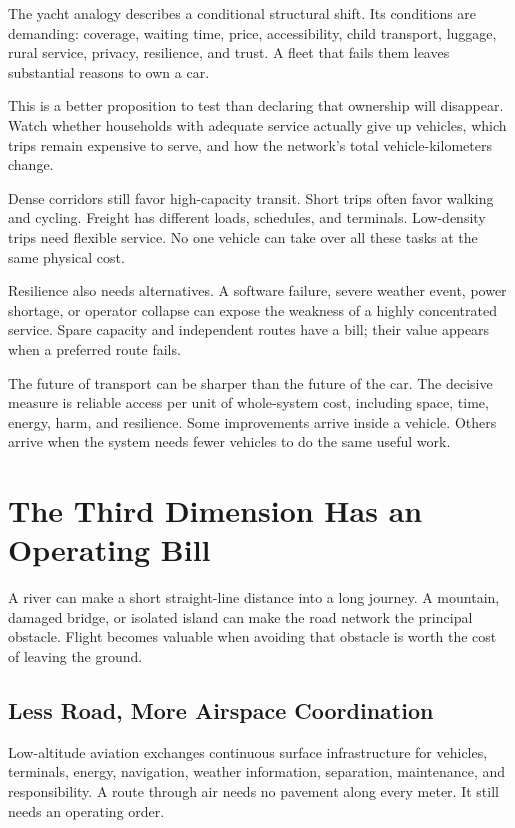 \documentclass[11pt,openany]{book}
\begin{document}
The yacht analogy describes a conditional structural shift. Its conditions are demanding: coverage, waiting time, price, accessibility, child transport, luggage, rural service, privacy, resilience, and trust. A fleet that fails them leaves substantial reasons to own a car.

This is a better proposition to test than declaring that ownership will disappear. Watch whether households with adequate service actually give up vehicles, which trips remain expensive to serve, and how the network's total vehicle-kilometers change.

Dense corridors still favor high-capacity transit. Short trips often favor walking and cycling. Freight has different loads, schedules, and terminals. Low-density trips need flexible service. No one vehicle can take over all these tasks at the same physical cost.

Resilience also needs alternatives. A software failure, severe weather event, power shortage, or operator collapse can expose the weakness of a highly concentrated service. Spare capacity and independent routes have a bill; their value appears when a preferred route fails.

The future of transport can be sharper than the future of the car. The decisive measure is reliable access per unit of whole-system cost, including space, time, energy, harm, and resilience. Some improvements arrive inside a vehicle. Others arrive when the system needs fewer vehicles to do the same useful work.

\section{The Third Dimension Has an Operating Bill}

A river can make a short straight-line distance into a long journey. A mountain, damaged bridge, or isolated island can make the road network the principal obstacle. Flight becomes valuable when avoiding that obstacle is worth the cost of leaving the ground.

\subsection{Less Road, More Airspace Coordination}

Low-altitude aviation exchanges continuous surface infrastructure for vehicles, terminals, energy, navigation, weather information, separation, maintenance, and responsibility. A route through air needs no pavement along every meter. It still needs an operating order.
\end{document}
